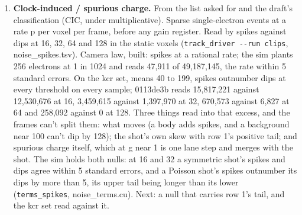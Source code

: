 \begin{enumerate}
A voxel and its x neighbor share the scale. The neighbor route loses it and the raw route carries it (row 26). Camera law, built: a plane offset per frame; the sim plants variance 4 and reads 36‰ against 38 within 6. A shared scale with memory is built: the camera law gains a scale path in octaves (\texttt{scale\_\allowbreak{}square}, \texttt{scale\_\allowbreak{}octaves}, \texttt{scale\_\allowbreak{}bits}), about 1 ± 6\% at 4 octaves and 10 bits in \texttt{noise\_\allowbreak{}terms}, and \texttt{noise\_\allowbreak{}structure\_\allowbreak{}volume} fits (d\_\allowbreak{}k − d\_\allowbreak{}\{k,x\})² against q = (Σ\_\allowbreak{}t I − Σ\_\allowbreak{}t I\_\allowbreak{}x)² and the pair total. D\_\allowbreak{}a at lags 1, 2, 4, 8, 16, 32 and 64 reads 3731, 5783, 7744, 11596, 11592, 11750 and 8758 millionths, against the camera's own path 3692, 5737, 7653, 11471, 11442, 11726 and 8690, within 500. As a box's root (E16), the planes term is shared along y and x, one value for each frame and z, and the shared scale's value in each plane of a frame is inside that pattern; planted alone as a plane offset it saves 7‰ at variance 64, 28‰ at 256 and 59‰ at 1,024. What makes it (the light, the focus or the acquisition) isn't in the frames; it sits in Ω until its source is named. Next: the fit on the kcr set.
\item \textbf{Clock-induced / spurious charge.} From the list asked for and the draft's classification (CIC, under multiplicative). Sparse single-electron events at a rate p per voxel per frame, before any gain register. Read by spikes against dips at 16, 32, 64 and 128 in the static voxels (\texttt{track\_\allowbreak{}driver -\allowbreak{}-\allowbreak{}run clips}, noise\_\allowbreak{}spikes.tsv). Camera law, built: spikes at a rational rate; the sim plants 256 electrons at 1 in 1024 and reads 47,911 of 49,187,145, the rate within 5 standard errors. On the kcr set, means 40 to 199, spikes outnumber dips at every threshold on every sample; 0113de3b reads 15,817,221 against 12,530,676 at 16, 3,459,615 against 1,397,970 at 32, 670,573 against 6,827 at 64 and 258,092 against 0 at 128. Three things read into that excess, and the frames can't split them: what moves (a body adds spikes, and a background near 100 can't dip by 128); the shot's own skew with row 1's positive tail; and spurious charge itself, which at g near 1 is one lane step and merges with the shot. The sim holds both nulls: at 16 and 32 a symmetric shot's spikes and dips agree within 5 standard errors, and a Poisson shot's spikes outnumber its dips by more than 5, its upper tail being longer than its lower (\texttt{terms\_\allowbreak{}spikes}, noise\_\allowbreak{}terms.cu). Next: a null that carries row 1's tail, and the kcr set read against it.

\end{enumerate}
